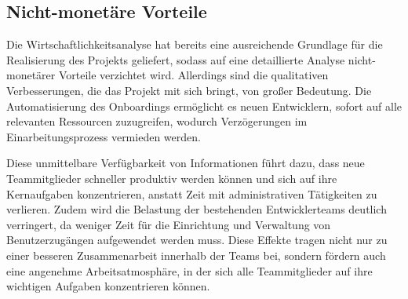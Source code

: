 \subsection{Nicht-monetäre Vorteile}
\label{sec:Nutzwertanalyse}

Die Wirtschaftlichkeitsanalyse hat bereits eine ausreichende Grundlage für die Realisierung des Projekts geliefert, sodass auf eine detaillierte Analyse nicht-monetärer Vorteile verzichtet wird. Allerdings sind die qualitativen Verbesserungen, die das Projekt mit sich bringt, von großer Bedeutung. Die Automatisierung des Onboardings ermöglicht es neuen Entwicklern, sofort auf alle relevanten Ressourcen zuzugreifen, wodurch Verzögerungen im Einarbeitungsprozess vermieden werden. 

Diese unmittelbare Verfügbarkeit von Informationen führt dazu, dass neue Teammitglieder schneller produktiv werden können und sich auf ihre Kernaufgaben konzentrieren, anstatt Zeit mit administrativen Tätigkeiten zu verlieren. Zudem wird die Belastung der bestehenden Entwicklerteams deutlich verringert, da weniger Zeit für die Einrichtung und Verwaltung von Benutzerzugängen aufgewendet werden muss. Diese Effekte tragen nicht nur zu einer besseren Zusammenarbeit innerhalb der Teams bei, sondern fördern auch eine angenehme Arbeitsatmosphäre, in der sich alle Teammitglieder auf ihre wichtigen Aufgaben konzentrieren können.
